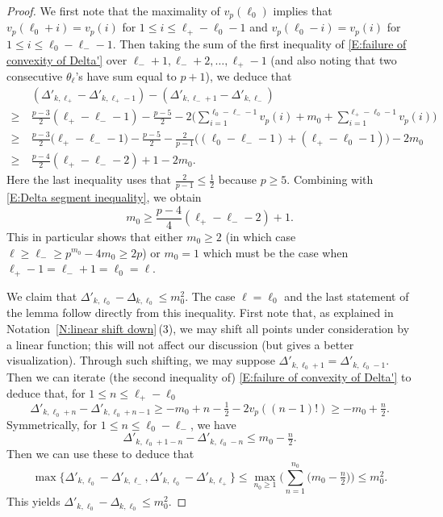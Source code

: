 \documentclass[12pt]{amsart}
\theoremstyle{definition}
\numberwithin{equation}{subsection}
\begin{document}
\begin{proof}
We first note that the maximality of $v_p(\ell_0)$ implies that $v_p(\ell_0+i)=v_p(i)$ for $1\leq i\leq \ell_+-\ell_0-1$ and $v_p(\ell_0-i)=v_p(i)$ for $1\leq i\leq \ell_0-\ell_--1$. Then taking the sum of the first inequality of \eqref{E:failure of convexity of Delta'} over $\ell_-+1,\ell_-+2, \dots, \ell_+-1$ (and also noting that two consecutive $\theta_{\ell}$'s have sum equal to $p+1$), we deduce that
\begin{align*}
&(\Delta'_{k, \ell_+}-\Delta'_{k, \ell_+-1})  -  (\Delta'_{k, \ell_-+1}-\Delta'_{k, \ell_-})
\\
\geq \ & \frac{p-3}2( \ell_+-\ell_--1) - \frac{p-5}2 -2\Big( \sum_{i=1}^{\ell_0-\ell_--1}v_p(i) + m_0 + \sum_{i=1}^{\ell_+-\ell_0-1}v_p(i)\Big)
\\
\geq \ & \frac{p-3}2\big( \ell_+-\ell_--1\big) - \frac{p-5}2 -\frac{2}{p-1}\big((\ell_0-\ell_--1) + (\ell_+-\ell_0-1)\big) -2m_0
\\
\geq\ & \frac{p-4}{2}(\ell_+-\ell_--2)+1-2m_0.
\end{align*}
Here the last inequality uses that $\frac{2}{p-1}\leq \frac 12$ because $p \geq 5$.
Combining with \eqref{E:Delta segment inequality}, we obtain
\begin{equation}
\label{E:plus-minus}
m_0 \geq
\frac{p-4}{4}(\ell_+-\ell_--2) + 1.
\end{equation}
This in particular shows that either $m_0 \geq 2$ (in which case $\ell \geq \ell_- \geq p^{m_0} - 4m_0\geq 2p$) or $m_0=1$ which must be the case when $\ell_+-1=\ell_-+1 = \ell_0 = \ell$.

We claim that $\Delta'_{k, \ell_0} - \Delta_{k, \ell_0} \leq m_0^2$. The case $\ell=\ell_0$ and the last statement of the lemma follow directly from this inequality. First note that, as explained in Notation~\ref{N:linear shift down}\,(3), we may shift all points under consideration by a linear function; this will not affect our discussion (but gives a better visualization). Through such shifting, we may suppose $\Delta'_{k, \ell_0+1}=\Delta'_{k, \ell_0-1}$. Then we can iterate (the second inequality of) \eqref{E:failure of convexity of Delta'} to deduce that, for $1\leq n \leq \ell_+-\ell_0$
\[
\Delta'_{k, \ell_0+ n} - \Delta'_{k, \ell_0+n-1}  \geq -m_0 +n - \tfrac{1}2- 2v_p((n-1)!)\geq -m_0+\tfrac n2.
\]
Symmetrically, for $1\leq n \leq \ell_0-\ell_-$, we have
$$ 
\Delta'_{k, \ell_0+1-n} - \Delta'_{k, \ell_0-n} \leq m_0-\tfrac n2.
$$
Then we can use these to deduce that
\[
\max\{\Delta'_{k, \ell_0} - \Delta'_{k, \ell_-}, \Delta'_{k, \ell_0} - \Delta'_{k, \ell_+}  \}
\leq \max_{n_0\geq 1}\Big( \sum_{n=1}^{n_0} \big(m_0-\tfrac n2\big)\Big) \leq  m_0^2.
\]
This yields $\Delta'_{k, \ell_0} - \Delta_{k, \ell_0} \leq m_0^2$. 


\end{proof}
\end{document}
